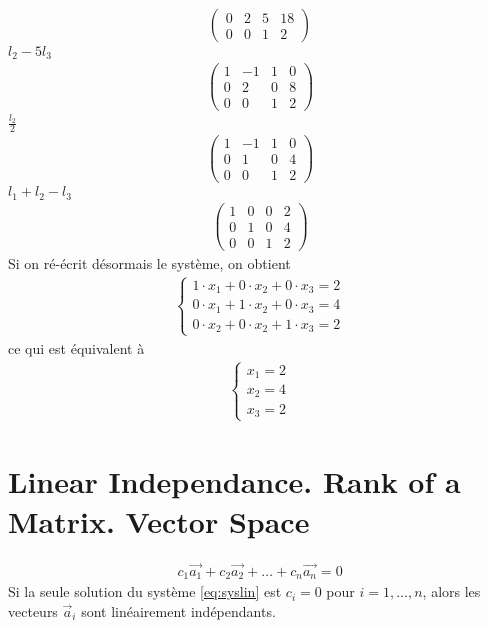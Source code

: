 \begin{myExample}
\begin{eqnarray*}
\begin{pmatrix}
			0&2&5&18\\
			0&0&1&2
		\end{pmatrix}
	\end{eqnarray*}
	$l_2-5l_3$
	\begin{eqnarray*}
		\begin{pmatrix}
			1 & -1 & 1 & 0\\
			0&2&0&8\\
			0&0&1&2
		\end{pmatrix}
	\end{eqnarray*}
	$\frac{l_2}{2}$
	\begin{eqnarray*}
		\begin{pmatrix}
			1 & -1 & 1 & 0\\
			0&1&0&4\\
			0&0&1&2
		\end{pmatrix}
	\end{eqnarray*}
	$l_1+l_2-l_3$
	\begin{eqnarray*}
		\begin{pmatrix}
			1 & 0 & 0 & 2\\
			0&1&0&4\\
			0&0&1&2
		\end{pmatrix}
	\end{eqnarray*}
	Si on ré-écrit désormais le système, on obtient
	\begin{eqnarray*}
		\begin{cases}
			1\cdot x_1+0\cdot x_2+0\cdot x_3=2\\
			0\cdot x_1+1\cdot x_2+0\cdot x_3=4\\
			0\cdot x_2+0\cdot x_2+1\cdot x_3=2
		\end{cases}
	\end{eqnarray*}
	ce qui est équivalent à
	\begin{eqnarray*}
		\begin{cases}
			x_1=2\\
			x_2=4\\
			x_3=2
		\end{cases}
	\end{eqnarray*}
\begin{comment}
	\begin{eqnarray*}
		-\frac{19}{2}x_3=-19\Rightarrow x_3=2
		\\
		a
	\end{eqnarray*}
	

\end{comment}
\end{myExample}
\chapter{Linear Independance. Rank of a Matrix. Vector Space}
\begin{eqnarray}
	\label{eq:syslin}c_1\overrightarrow{a_1}+c_2\overrightarrow{a_2}+\dots+c_n\overrightarrow{a_n}=0
\end{eqnarray}
Si la seule solution du système \ref{eq:syslin} est $c_i=0$ pour $i=1,\dots,n$, alors les vecteurs $\overrightarrow a_i$ sont linéairement indépendants.

